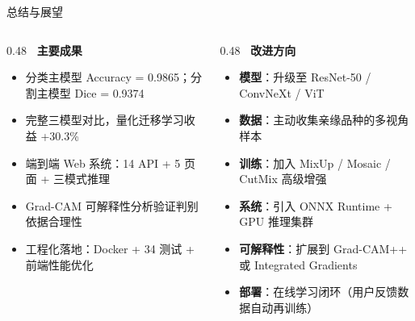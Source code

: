 \documentclass[aspectratio=169, 11pt]{ctexbeamer}
\begin{document}
\begin{frame}{总结与展望}
\begin{columns}[T]
  \begin{column}{0.48\linewidth}
    \textbf{\color{NWUBlue}\faCheckCircle\ 主要成果}
    \begin{itemize}\footnotesize
      \item 分类主模型 \alert{Accuracy = 0.9865}；分割主模型 \alert{Dice = 0.9374}
      \item 完整三模型对比，量化迁移学习收益 \alert{+30.3\%}
      \item 端到端 Web 系统：14 API + 5 页面 + 三模式推理
      \item Grad-CAM 可解释性分析验证判别依据合理性
      \item 工程化落地：Docker + 34 测试 + 前端性能优化
    \end{itemize}
  \end{column}
  \begin{column}{0.48\linewidth}
    \textbf{\color{AccentOrange}\faLightbulb\ 改进方向}
    \begin{itemize}\footnotesize
      \item \textbf{模型}：升级至 ResNet-50 / ConvNeXt / ViT
      \item \textbf{数据}：主动收集亲缘品种的多视角样本
      \item \textbf{训练}：加入 MixUp / Mosaic / CutMix 高级增强
      \item \textbf{系统}：引入 ONNX Runtime + GPU 推理集群
      \item \textbf{可解释性}：扩展到 Grad-CAM++ 或 Integrated Gradients
      \item \textbf{部署}：在线学习闭环（用户反馈数据自动再训练）
    \end{itemize}
  \end{column}
\end{columns}
\end{frame}
\end{document}
